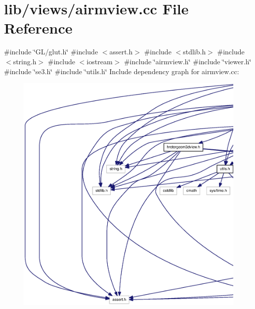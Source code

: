 \section{lib/views/airmview.cc \-File \-Reference}
\label{airmview_8cc}
{\ttfamily \#include \char`\"{}\-G\-L/glut.\-h\char`\"{}}\*
{\ttfamily \#include $<$assert.\-h$>$}\*
{\ttfamily \#include $<$stdlib.\-h$>$}\*
{\ttfamily \#include $<$string.\-h$>$}\*
{\ttfamily \#include $<$iostream$>$}\*
{\ttfamily \#include \char`\"{}airmview.\-h\char`\"{}}\*
{\ttfamily \#include \char`\"{}viewer.\-h\char`\"{}}\*
{\ttfamily \#include \char`\"{}se3.\-h\char`\"{}}\*
{\ttfamily \#include \char`\"{}utils.\-h\char`\"{}}\*
\-Include dependency graph for airmview.\-cc\-:
\nopagebreak
\begin{figure}[H]
\begin{center}
\leavevmode
\includegraphics[width=350pt]{airmview_8cc__incl}
\end{center}
\end{figure}
